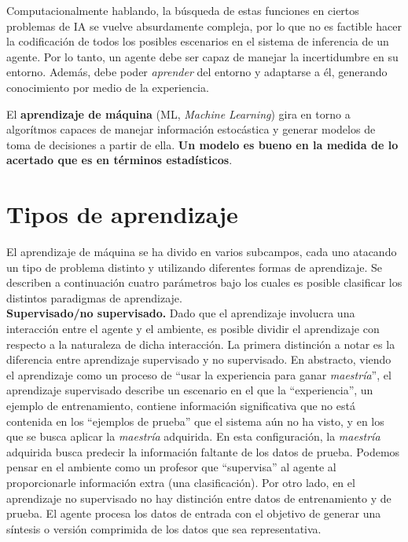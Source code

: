 Computacionalmente hablando, la búsqueda de estas funciones en ciertos
problemas de IA se vuelve absurdamente compleja, por lo que no es
factible hacer la codificación de todos los posibles escenarios en el
sistema de inferencia de un agente. Por lo tanto, un agente debe ser
capaz de manejar la incertidumbre en su entorno. Además, debe
poder \textit{aprender} del entorno y adaptarse a él, generando
conocimiento por medio de la experiencia.

El \textbf{aprendizaje de máquina} (ML, \textit{Machine Learning})
gira en torno a algorítmos capaces de manejar información estocástica
y generar modelos de toma de decisiones a partir de ella. \textbf{Un
modelo es bueno en la medida de lo acertado que es en términos
estadísticos}.

\section{Tipos de aprendizaje}
El aprendizaje de máquina se ha divido en varios subcampos, cada uno
atacando un tipo de problema distinto y utilizando diferentes formas
de aprendizaje. Se describen a continuación cuatro parámetros bajo
los cuales es posible clasificar los distintos paradigmas de
aprendizaje.\\

\textbf{Supervisado/no supervisado.} Dado que el aprendizaje involucra
una interacción entre el agente y el ambiente, es posible
dividir el aprendizaje con respecto a la naturaleza de dicha interacción.
La primera distinción a notar es la diferencia entre aprendizaje supervisado
y no supervisado. En abstracto, viendo el aprendizaje como un proceso
de ``usar la experiencia para ganar \textit{maestría}'', el aprendizaje
supervisado describe un escenario en el que la ``experiencia'', un
ejemplo de entrenamiento, contiene información significativa que no
está contenida en los ``ejemplos de prueba'' que el sistema aún no ha
visto, y en los que se busca aplicar la \textit{maestría} adquirida.
En esta configuración, la \textit{maestría} adquirida busca
predecir la información faltante de los datos de prueba. Podemos
pensar en el ambiente como un profesor que ``supervisa'' al agente
al proporcionarle información extra (una clasificación). Por otro lado,
en el aprendizaje no supervisado no hay distinción entre datos de
entrenamiento y de prueba. El agente procesa los datos de entrada
con el objetivo de generar una síntesis o versión comprimida de los
datos que sea representativa.\\

